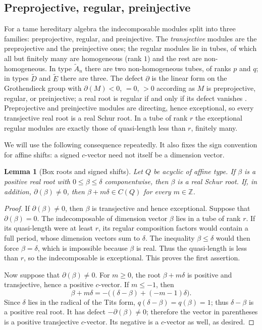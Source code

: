 \documentclass[11pt, a4paper]{amsart}
\newtheorem{lemma}[theorem]{Lemma}
\theoremstyle{definition}
\newcommand{\ZZ}{\mathbb{Z}}
\begin{document}
\subsection*{Preprojective, regular, preinjective}
For a tame hereditary algebra the indecomposable modules split into three
families: preprojective, regular, and preinjective. The
\emph{transjective} modules are the preprojective and the preinjective
ones; the regular modules lie in tubes, of which all but finitely many
are homogeneous (rank $1$) and the rest are non-homogeneous. In type
$\widetilde{A}_n$ there are two non-homogeneous tubes, of ranks $p$ and
$q$; in types $\widetilde{D}$ and $\widetilde{E}$ there are three. The
defect $\partial$ is the linear form on the
Grothendieck group with $\partial(M) < 0$, $= 0$, $> 0$ according as $M$
is preprojective, regular, or preinjective; a real root is regular if and
only if its defect vanishes \cite{Ringel1984}. Preprojective and
preinjective modules are directing, hence exceptional, so every
transjective real root is a real Schur root. In a tube of rank $r$ the
exceptional regular modules are exactly those of quasi-length less than
$r$, finitely many.

We will use the following consequence repeatedly. It also fixes the sign
convention for affine shifts: a signed $c$-vector need not itself be a
dimension vector.

\begin{lemma}[Box roots and signed shifts]
\label{lem:box_schur}
Let $Q$ be acyclic of affine type. If $\beta$ is a positive real root with
$0 \leq \beta \leq \delta$ componentwise, then $\beta$ is a real Schur
root. If, in addition, $\partial(\beta) \neq 0$, then
$\beta + m\delta \in C(Q)$ for every $m \in \ZZ$.
\end{lemma}

\begin{proof}
If $\partial(\beta) \neq 0$, then $\beta$ is transjective and hence
exceptional. Suppose that $\partial(\beta) = 0$. The indecomposable of
dimension vector $\beta$ lies in a tube of rank $r$. If its quasi-length
were at least $r$, its regular composition factors would contain a full
period, whose dimension vectors sum to $\delta$. The inequality
$\beta \leq \delta$ would then force $\beta = \delta$, which is impossible
because $\beta$ is real. Thus the quasi-length is less than $r$, so the
indecomposable is exceptional. This proves the first assertion.

Now suppose that $\partial(\beta) \neq 0$. For $m \geq 0$, the root
$\beta + m\delta$ is positive and transjective, hence a positive
$c$-vector. If $m \leq -1$, then
\[
  \beta + m\delta
  = -\bigl((\delta - \beta) + (-m-1)\delta\bigr).
\]
Since $\delta$ lies in the radical of the Tits form,
$q(\delta-\beta)=q(\beta)=1$; thus $\delta - \beta$ is a positive real root.
It has defect $-\partial(\beta) \neq 0$; therefore the vector in parentheses is a
positive transjective $c$-vector. Its negative is a $c$-vector as well, as
desired.
\end{proof}
\end{document}
